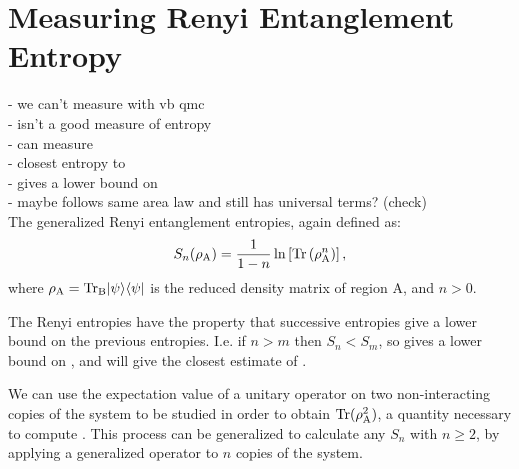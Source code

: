 \chapter{Measuring Renyi Entanglement Entropy}

\noindent
- we can't measure \vn with vb qmc\\
- \vb isn't a good measure of entropy\\
- can measure \re\\
 - closest entropy to \vn\\
 - gives a lower bound on \vn\\
 - maybe follows same area law and still has universal terms? (check)\\
 
The generalized Renyi entanglement entropies, again defined as:
\begin{equation} \label{renyis}
 	S_n(\rho_{\rm A}) = \frac{1}{1-n}\ln\left[{\rm Tr}\left( \rho_{\rm A}^n \right) \right],
\end{equation}
where $\rho_{\rm{A}}=\rm{Tr}_B\lvert {\psi} \rangle\langle {\psi} \rvert$ is the reduced density matrix of region A, and $n>0$.




The Renyi entropies have the property that successive entropies give a lower bound on the previous entropies.  I.e. if $n>m$ then $S_n<S_m$, so \re gives a lower bound on \vN, and \re will give the closest estimate of \vN.

We can use the expectation value of a unitary \sw operator on two non-interacting copies of the system to be studied in order to obtain ${\rm Tr}(\rho_{\rm A}^2)$, a quantity necessary to compute \re.  
This process can be generalized to calculate any $S_n$ with $n \ge 2$, by applying a generalized \sw operator to $n$ copies of the system. 

